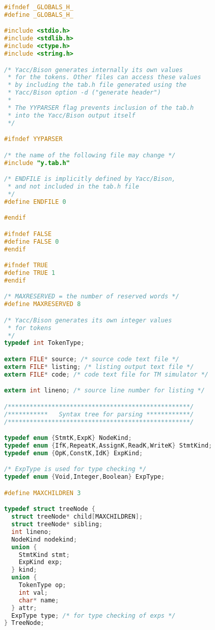 \documentclass[lang=cn,10pt]{elegantbook}
\begin{document}
\begin{lstlisting}[caption={globals.h},language=c]
#ifndef _GLOBALS_H_
#define _GLOBALS_H_

#include <stdio.h>
#include <stdlib.h>
#include <ctype.h>
#include <string.h>

/* Yacc/Bison generates internally its own values
 * for the tokens. Other files can access these values
 * by including the tab.h file generated using the
 * Yacc/Bison option -d ("generate header")
 *
 * The YYPARSER flag prevents inclusion of the tab.h
 * into the Yacc/Bison output itself
 */

#ifndef YYPARSER

/* the name of the following file may change */
#include "y.tab.h"

/* ENDFILE is implicitly defined by Yacc/Bison,
 * and not included in the tab.h file
 */
#define ENDFILE 0

#endif

#ifndef FALSE
#define FALSE 0
#endif

#ifndef TRUE
#define TRUE 1
#endif

/* MAXRESERVED = the number of reserved words */
#define MAXRESERVED 8

/* Yacc/Bison generates its own integer values
 * for tokens
 */
typedef int TokenType; 

extern FILE* source; /* source code text file */
extern FILE* listing; /* listing output text file */
extern FILE* code; /* code text file for TM simulator */

extern int lineno; /* source line number for listing */

/**************************************************/
/***********   Syntax tree for parsing ************/
/**************************************************/

typedef enum {StmtK,ExpK} NodeKind;
typedef enum {IfK,RepeatK,AssignK,ReadK,WriteK} StmtKind;
typedef enum {OpK,ConstK,IdK} ExpKind;

/* ExpType is used for type checking */
typedef enum {Void,Integer,Boolean} ExpType;

#define MAXCHILDREN 3

typedef struct treeNode {
  struct treeNode* child[MAXCHILDREN];
  struct treeNode* sibling;
  int lineno;
  NodeKind nodekind;
  union {
    StmtKind stmt;
    ExpKind exp;
  } kind;
  union {
    TokenType op;
    int val;
    char* name;
  } attr;
  ExpType type; /* for type checking of exps */
} TreeNode;


\end{lstlisting}
\end{document}
